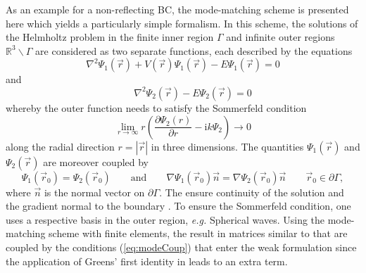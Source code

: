 As an example for a non-reflecting BC, the mode-matching scheme \cite{AstleyMM} is presented here which yields a particularly simple formalism.
In this scheme, the solutions of the Helmholtz problem in the finite inner region $\Gamma$ and infinite outer regions $\mathbb{R}^3\backslash \Gamma$ are considered as two separate functions, each described by the equations
\begin{equation}
   \label{eq:modeMatch}
   \nabla^2\Psi_1(\vec{r}) +V(\vec{r})\Psi_1(\vec{r})-E\Psi_1(\vec{r})=0 
\end{equation}
and
\begin{equation}
   \qquad \nabla^2\Psi_2(\vec{r}) -E\Psi_2(\vec{r})=0 
\end{equation}
whereby the outer function needs to satisfy the Sommerfeld condition \cite{sommerfeldCond} 
\begin{equation} \label{eq:Sommer}
\lim_{r\rightarrow\infty} r \left(\frac{\partial \Psi_2(r)}{\partial r} - \text{i}k \Psi_2  \right)\rightarrow 0
\end{equation}
along the radial direction $r=|\vec{r}|$ in three dimensions.
The quantities $\Psi_1(\vec{r})$ and $\Psi_2(\vec{r})$ are moreover coupled by 
\begin{equation}
\label{eq:modeCoup}
\Psi_1(\vec{r}_0)=\Psi_2(\vec{r}_0)  \qquad \text{and} \qquad 
\nabla \Psi_1(\vec{r}_0) \vec{n}=\nabla \Psi_2(\vec{r}_0) \vec{n}  \qquad \vec{r}_0 \in \partial \Gamma,
\end{equation}
where $\vec{n}$ is the normal vector on $\partial \Gamma$.
The  ensure continuity of the solution and the gradient normal to the boundary \cite{AstleyMM}.
To ensure the Sommerfeld condition, one uses a respective basis in the outer region, \textit{e.g.} Spherical waves.
Using the mode-matching scheme with finite elements, the  result in matrices similar to  that are coupled by the conditions (\ref{eq:modeCoup}) that enter the weak formulation since the application of Greens' first identity in  leads to an extra term.

